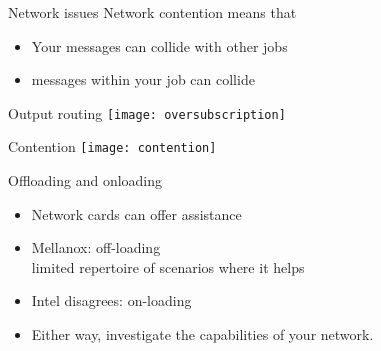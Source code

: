 \begin{frame}[containsverbatim]{Network issues}
  Network contention means that
  \begin{itemize}
  \item Your messages can collide with other jobs
  \item messages within your job can collide
  \end{itemize}
\end{frame}

\begin{frame}{Output routing}
  \texttt{[image: oversubscription]}
\end{frame}

\begin{frame}{Contention}
  \texttt{[image: contention]}
\end{frame}

\begin{frame}[containsverbatim]{Offloading and onloading}

  \begin{itemize}
  \item Network cards can offer assistance
  \item Mellanox: off-loading\\
    limited repertoire of scenarios where it helps
  \item Intel disagrees: on-loading
  \item Either way, investigate the capabilities of your network.
  \end{itemize}
\end{frame}

